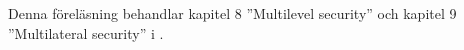 Denna föreläsning behandlar kapitel 8 ''\foreignlanguage{english}{Multilevel 
security}'' och kapitel 9 ''\foreignlanguage{english}{Multilateral security}'' 
i \cite{Anderson2008sea}.
